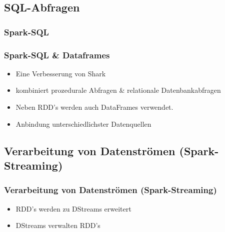 \documentclass[hyperref={pdfpagelabels=false}]{beamer}
\begin{document}
\subsection{SQL-Abfragen}
\subsubsection{Spark-SQL}
\begin{frame} 
\frametitle{Spark-SQL \& Dataframes}
\begin{itemize}
	\item Eine Verbesserung von Shark
	\item kombiniert prozedurale Abfragen \& relationale Datenbankabfragen
	\item Neben RDD's werden auch DataFrames verwendet.
	\item Anbindung unterschiedlichster Datenquellen
\end{itemize}
\end{frame}


\subsection{Verarbeitung von Datenströmen (Spark-Streaming)}
\begin{frame} 
\frametitle{Verarbeitung von Datenströmen (Spark-Streaming)}

\begin{itemize}
	\item RDD's werden zu DStreams erweitert
	\item DStreams verwalten RDD's
\end{itemize}

\begin{figure}[h]
  \centering
\end{figure}

\end{frame}
\end{document}
